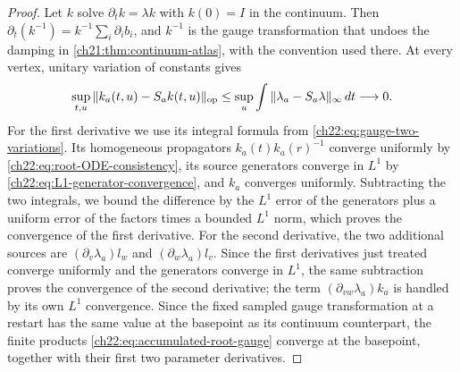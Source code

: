 \begin{proof}
Let $k$ solve $\partial_tk=\lambda k$ with $k(0)=I$ in the continuum. Then $\partial_t(k^{-1})=k^{-1}\sum_i\partial_ib_i$, and $k^{-1}$ is the gauge transformation that undoes the damping in \cref{ch21:thm:continuum-atlas}, with the convention used there. At every vertex, unitary variation of constants gives
\begin{equation}\label{ch22:eq:root-ODE-consistency}
 \sup_{t,u}\|k_a(t,u)-S_ak(t,u)\|_{\rm op}\le\sup_u\int\|\lambda_a-S_a\lambda\|_\infty\,dt\longrightarrow0 .
\end{equation}
For the first derivative we use its integral formula from \eqref{ch22:eq:gauge-two-variations}. Its homogeneous propagators $k_a(t)k_a(r)^{-1}$ converge uniformly by \eqref{ch22:eq:root-ODE-consistency}, its source generators converge in $L^1$ by \eqref{ch22:eq:L1-generator-convergence}, and $k_a$ converges uniformly. Subtracting the two integrals, we bound the difference by the $L^1$ error of the generators plus a uniform error of the factors times a bounded $L^1$ norm, which proves the convergence of the first derivative. For the second derivative, the two additional sources are $(\partial_v\lambda_a)l_w$ and $(\partial_w\lambda_a)l_v$. Since the first derivatives just treated converge uniformly and the generators converge in $L^1$, the same subtraction proves the convergence of the second derivative; the term $(\partial_{vw}\lambda_a)k_a$ is handled by its own $L^1$ convergence. Since the fixed sampled gauge transformation at a restart has the same value at the basepoint as its continuum counterpart, the finite products \eqref{ch22:eq:accumulated-root-gauge} converge at the basepoint, together with their first two parameter derivatives.


\end{proof}
